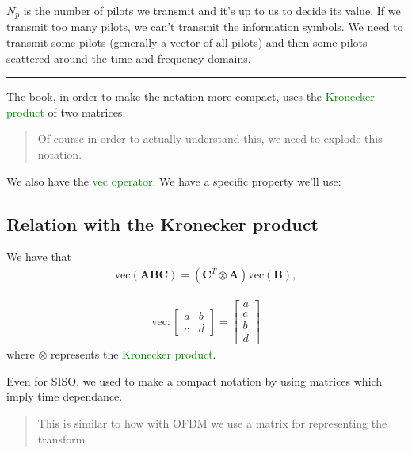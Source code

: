 \documentclass[a4paper, 12pt]{book}
\begin{document}
$N_p$ is the number of pilots we transmit and it's up to us to decide its value.
If we transmit too many pilots, we can't transmit the information symbols.
We need to transmit some pilots (generally a vector of all pilots) and then some pilots scattered around the time and frequency domains.

\noindent\rule{\textwidth}{0.4pt}

The book, in order to make the notation more compact, uses the \textcolor{green}{Kronecker product} of two matrices.

\begin{quote}
    \color{gray}\vline\hspace{0.5em}\color{black} Of course in order to actually understand this, we need to explode this notation.
\end{quote}

We also have the \textcolor{green}{vec operator}. We have a specific property we'll use:

\subsection*{Relation with the Kronecker product}
We have that
\begin{align}
\text{vec}(\boldsymbol{ABC}) = (\boldsymbol{C}^T \otimes \boldsymbol{A})\text{vec}(\boldsymbol{B}),
\end{align}

\begin{align*}
\text{vec} : \begin{bmatrix} a & b \\ c & d \end{bmatrix} = \begin{bmatrix} a \\ c \\ b \\ d \end{bmatrix}
\end{align*}
where $\otimes$ represents the \textcolor{green}{Kronecker product}.

Even for SISO, we used to make a compact notation by using matrices which imply time dependance.

\begin{quote}
    \color{green}\vline\hspace{0.5em}\color{black} This is similar to how with OFDM we use a matrix for representing the transform
\end{quote}
\end{document}
